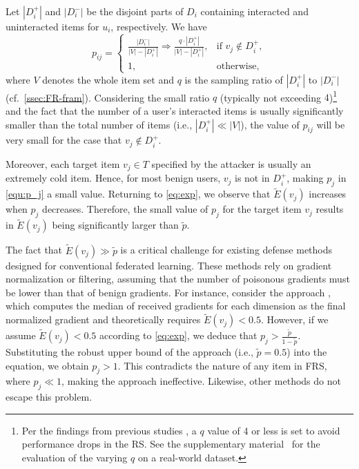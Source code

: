 Let $|{D}^{+}_i|$ and $|{D}^{-}_i|$ be the disjoint parts of ${D}_i$ containing interacted and uninteracted items for $u_i$, respectively.
%
We have
\begin{equation}
p_{{ij}}=\begin{cases}
\frac{|{D}_i^-|}{|{V}|-|{D}_i^+|} \Rightarrow \frac{q \cdot |{D}_i^+|}{|{V}|-|{D}_i^+|}, & \text{if~}v_j\notin{D}_i^+,\\
1, &\text{otherwise},
\end{cases}
\end{equation}
where ${V}$ denotes the whole item set and $q$ is the sampling ratio of  $|{D}^{+}_i|$ to $|{D}^{-}_i|$ (cf.\ \cref{ssec:FR-fram}).
Considering the small ratio $q$ (typically not exceeding $4$)\footnote{
Per the findings from previous studies \cite{NCF, fedrecattack, pipattack, a-hum}, a $q$ value of 4 or less is set to avoid performance drops in the RS. See the supplementary material~\cite{github-pieck-supple} for the evaluation of the varying $q$ on a real-world dataset.}
and the fact that the number of a user's interacted items is usually significantly smaller than the total number of items (i.e., $|{D}_i^+| \ll |{V}|$), the value of $p_{{ij}}$ will be very small for the case that $v_j \notin {D}_i^+$.

Moreover, each target item $v_j \in {T}$ specified by the attacker is usually an extremely cold item. Hence, for most benign users, $v_j$ is not in ${D}_i^+$, making $p_j$ in \cref{equ:p_j} a small value.
Returning to \cref{eq:exp}, we observe that $\tilde{E}(v_j)$ increases when $p_j$ decreases. Therefore, the small value of $p_j$ for the target item $v_j$ results in $\tilde{E}(v_j)$ being significantly larger than $\tilde{p}$.

The fact that $\tilde{E}(v_j) \gg \tilde{p}$ is a critical challenge for existing defense methods\cite{NormBound,Media-TrimmedMean, Krum-MultiKrum, Bulyan} designed for conventional federated learning.
These methods rely on gradient normalization or filtering, assuming that the number of poisonous gradients must be lower than that of benign gradients.
For instance, consider the \MEDIAN{} approach \cite{Media-TrimmedMean}, which computes the median of received gradients for each dimension as the final normalized gradient and theoretically requires $\tilde{E}(v_j) < 0.5$.
However, if we assume $\tilde{E}(v_j) < 0.5$ according to \cref{eq:exp}, we deduce that $p_j > \frac{\tilde{p}}{1-\tilde{p}}$. Substituting the robust upper bound of the \MEDIAN{} approach (i.e., $\tilde{p}=0.5$) into the equation, we obtain $p_j > 1$. This contradicts the nature of any item in FRS, where $p_j \ll 1$, making the \MEDIAN{} approach ineffective.
Likewise, other methods do not escape this problem.

